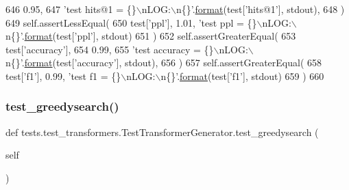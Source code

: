 \begin{DoxyCode}
646             0.95,
647             \textcolor{stringliteral}{'test hits@1 = \{\}\(\backslash\)nLOG:\(\backslash\)n\{\}'}.\hyperlink{namespaceparlai_1_1chat__service_1_1services_1_1messenger_1_1shared__utils_a32e2e2022b824fbaf80c747160b52a76}{format}(test[\textcolor{stringliteral}{'hits@1'}], stdout),
648         )
649         self.assertLessEqual(
650             test[\textcolor{stringliteral}{'ppl'}], 1.01, \textcolor{stringliteral}{'test ppl = \{\}\(\backslash\)nLOG:\(\backslash\)n\{\}'}.\hyperlink{namespaceparlai_1_1chat__service_1_1services_1_1messenger_1_1shared__utils_a32e2e2022b824fbaf80c747160b52a76}{format}(test[\textcolor{stringliteral}{'ppl'}], stdout)
651         )
652         self.assertGreaterEqual(
653             test[\textcolor{stringliteral}{'accuracy'}],
654             0.99,
655             \textcolor{stringliteral}{'test accuracy = \{\}\(\backslash\)nLOG:\(\backslash\)n\{\}'}.\hyperlink{namespaceparlai_1_1chat__service_1_1services_1_1messenger_1_1shared__utils_a32e2e2022b824fbaf80c747160b52a76}{format}(test[\textcolor{stringliteral}{'accuracy'}], stdout),
656         )
657         self.assertGreaterEqual(
658             test[\textcolor{stringliteral}{'f1'}], 0.99, \textcolor{stringliteral}{'test f1 = \{\}\(\backslash\)nLOG:\(\backslash\)n\{\}'}.\hyperlink{namespaceparlai_1_1chat__service_1_1services_1_1messenger_1_1shared__utils_a32e2e2022b824fbaf80c747160b52a76}{format}(test[\textcolor{stringliteral}{'f1'}], stdout)
659         )
660 
\end{DoxyCode}
\mbox{\label{classtests_1_1test__transformers_1_1TestTransformerGenerator_a46ea25442100b52add258989e9aa9860}} 
\subsubsection{\texorpdfstring{test\+\_\+greedysearch()}{test\_greedysearch()}}
{\footnotesize\ttfamily def tests.\+test\+\_\+transformers.\+Test\+Transformer\+Generator.\+test\+\_\+greedysearch (\begin{DoxyParamCaption}\item[{}]{self }\end{DoxyParamCaption})}

